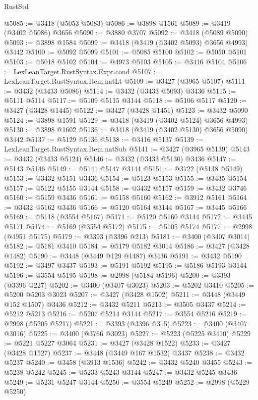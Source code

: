 \begin{lexlean}{RustStd}
\begin{coremodule}
@5085 := @3418 (@5053 @5083)
@5086 := @3898 @1561
@5089 := @3419 (@3402 @5086) @3656
@5090 := @3880 @3707
@5092 := @3418 (@5089 @5090)
@5093 := @3898 @1584
@5099 := @3418 (@3419 (@3402 @5093) @3656 @4993) @3442
@5100 := @5092 @5099
@5101 := @5085 @5100
@5102 := @5050 @5101
@5103 := @5018 @5102
@5104 := @4973 @5103
@5105 := @3416 @5104
@5106 := LexLeanTarget.RustSyntax.Expr.cond
@5107 := LexLeanTarget.RustSyntax.Item.natLt
@5109 := @3427 (@3965 @5107)
@5111 := @3432 (@3433 @5086)
@5114 := @3432 (@3433 @5093) @3436
@5115 := @5111 @5114
@5117 := @5109 @5115 @3144
@5118 := @5106 @5117
@5120 := @3427 (@3428 @1445)
@5122 := @3427 (@3428 @1451)
@5123 := @3432 @5090
@5124 := @3898 @1591
@5129 := @3418 (@3419 (@3402 @5124) @3656 @4993)
@5130 := @3898 @1602
@5136 := @3418 (@3419 (@3402 @5130) @3656 @5090) @3442
@5137 := @5129 @5136
@5138 := @3416 @5137
@5139 := LexLeanTarget.RustSyntax.Item.natSub
@5141 := @3427 (@3965 @5139)
@5143 := @3432 (@3433 @5124)
@5146 := @3432 (@3433 @5130) @3436
@5147 := @5143 @5146
@5149 := @5141 @5147 @3144
@5151 := @3722 (@5138 @5149)
@5153 := @3432 @5151 @3436
@5154 := @5123 @5153
@5155 := @3435 @5154
@5157 := @5122 @5155 @3144
@5158 := @3432 @5157
@5159 := @3432 @3746
@5160 := @5159 @3436
@5161 := @5158 @5160
@5162 := @3912 @5161
@5164 := @3432 @5162 @3436
@5166 := @5120 @5164 @3144
@5167 := @3445 @5166
@5169 := @5118 (@3554 @5167)
@5171 := @5120 @5160 @3144
@5172 := @3445 @5171
@5174 := @5169 (@3554 @5172)
@5175 := @5105 @5174
@5177 := @2998 (@4951 @5175)
@5179 := @3393 (@3396 @213)
@5181 := @3400 (@3407 @3014)
@5182 := @5181 @3410
@5184 := @5179 @5182 @3014
@5186 := @3427 (@3428 @1482)
@5190 := @3448 (@3449 @129 @1487) @3436
@5191 := @3432 @5190
@5192 := @3497 @3437
@5193 := @5191 @5192
@5195 := @5186 @5193 @3144
@5196 := @3554 @5195
@5198 := @2998 (@5184 @5196)
@5200 := @3393 (@3396 @227)
@5202 := @3400 (@3407 @3023)
@5203 := @5202 @3410
@5205 := @5200 @5203 @3023
@5207 := @3427 (@3428 @1502)
@5211 := @3448 (@3449 @152 @1507) @3436
@5212 := @3432 @5211
@5213 := @3505 @3437
@5214 := @5212 @5213
@5216 := @5207 @5214 @3144
@5217 := @3554 @5216
@5219 := @2998 (@5205 @5217)
@5221 := @3393 (@3396 @315)
@5223 := @3400 (@3407 @3016)
@5225 := @3400 (@3766 @3023)
@5227 := @5223 (@5225 @3410)
@5229 := @5221 @5227 @3064
@5231 := @3427 (@3428 @1522)
@5233 := @3427 (@3428 @1527)
@5237 := @3448 (@3449 @167 @1532) @3437
@5238 := @3432 @5237
@5240 := @3458 (@3913 @1536)
@5242 := @3432 @5240 @3455
@5243 := @5238 @5242
@5245 := @5233 @5243 @3144
@5247 := @3432 @5245 @3436
@5249 := @5231 @5247 @3144
@5250 := @3554 @5249
@5252 := @2998 (@5229 @5250)

\end{coremodule}
\end{lexlean}
